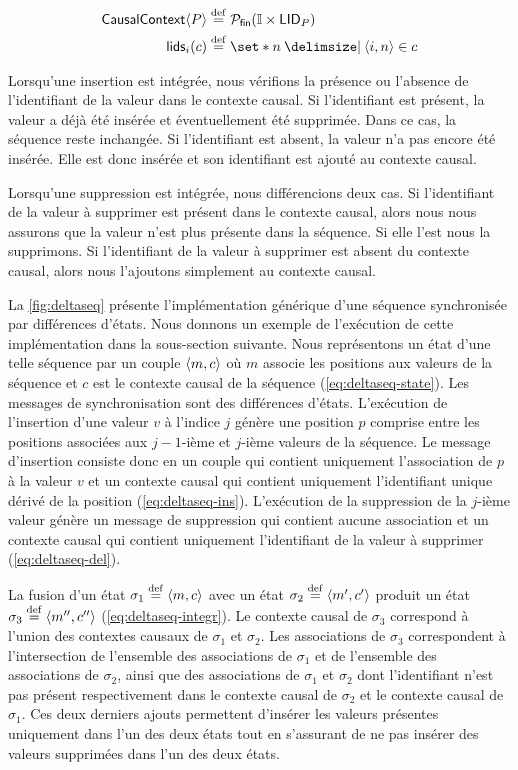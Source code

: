 \begin{align}
\trm{CausalContext}\tuple*{P} &\defeq \powerfset{\mathbb{I} \times \trm{LID}_P}\label{eq:cc-state}\\
\trm{lids}_i(c) &\defeq \set*{n \given \tuple*{i, n} \in c}\label{eq:cc-lids}
\end{align}

Lorsqu'une insertion est intégrée, nous vérifions la présence ou l'absence de l'identifiant de la valeur dans le contexte causal.
Si l'identifiant est présent, la valeur a déjà été insérée et éventuellement été supprimée.
Dans ce cas, la séquence reste inchangée.
Si l'identifiant est absent, la valeur n'a pas encore été insérée.
Elle est donc insérée et son identifiant est ajouté au contexte causal.

Lorsqu'une suppression est intégrée, nous différencions deux cas.
Si l'identifiant de la valeur à supprimer est présent dans le contexte causal, alors nous nous assurons que la valeur n'est plus présente dans la séquence.
Si elle l'est nous la supprimons.
Si l'identifiant de la valeur à supprimer est absent du contexte causal, alors nous l'ajoutons simplement au contexte causal.

La \autoref{fig:deltaseq} présente l'implémentation générique d'une séquence synchronisée par différences d'états.
Nous donnons un exemple de l'exécution de cette implémentation dans la sous-section suivante.
Nous représentons un état d'une telle séquence par un couple $\tuple*{m, c}$ où $m$ associe les positions aux valeurs de la séquence et $c$ est le contexte causal de la séquence (\autoref{eq:deltaseq-state}).
Les messages de synchronisation sont des différences d'états.
L'exécution de l'insertion d'une valeur $v$ à l'indice $j$ génère une position $p$ comprise entre les positions associées aux $j-1$-ième et $j$-ième valeurs de la séquence.
Le message d'insertion consiste donc en un couple qui contient uniquement l'association de $p$ à la valeur $v$ et un contexte causal qui contient uniquement l'identifiant unique dérivé de la position (\autoref{eq:deltaseq-ins}).
L'exécution de la suppression de la $j$-ième valeur génère un message de suppression qui contient aucune association et un contexte causal qui contient uniquement l'identifiant de la valeur à supprimer (\autoref{eq:deltaseq-del}).

La fusion d'un état $\sigma_1 \defeq \tuple*{m, c}$ avec un état $\sigma_2 \defeq \tuple*{m', c'}$ produit un état $\sigma_3 \defeq \tuple*{m'', c''}$ (\autoref{eq:deltaseq-integr}).
Le contexte causal de $\sigma_3$ correspond à l'union des contextes causaux de $\sigma_1$ et $\sigma_2$.
Les associations de $\sigma_3$ correspondent à l'intersection de l'ensemble des associations de $\sigma_1$ et de l'ensemble des associations de $\sigma_2$, ainsi que des associations de $\sigma_1$ et $\sigma_2$ dont l'identifiant n'est pas présent respectivement dans le contexte causal de $\sigma_2$ et le contexte causal de $\sigma_1$.
Ces deux derniers ajouts permettent d'insérer les valeurs présentes uniquement dans l'un des deux états tout en s'assurant de ne pas insérer des valeurs supprimées dans l'un des deux états.

